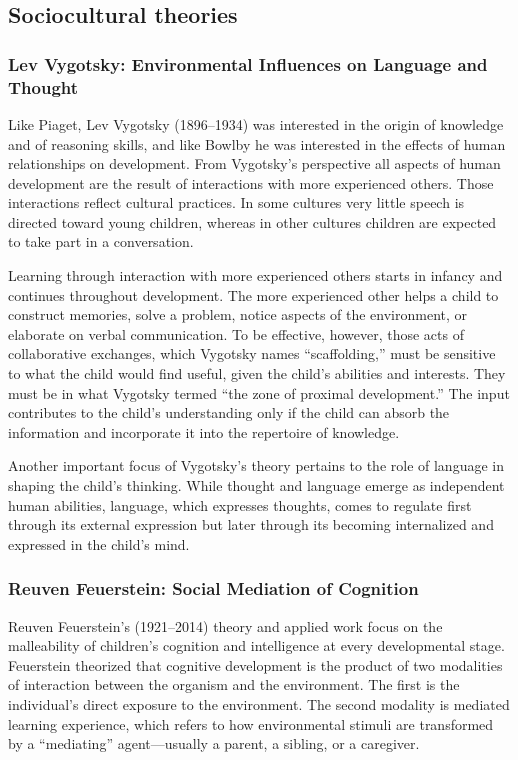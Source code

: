 \subsection{Sociocultural theories}
\subsubsection{Lev Vygotsky: Environmental Influences on Language and Thought}
Like Piaget, Lev Vygotsky (1896–1934) was interested in the origin of knowledge
and of reasoning skills, and like Bowlby he was interested in the effects of
human relationships on development. From Vygotsky’s perspective all aspects of
human development are the result of interactions with more experienced others.
Those interactions reflect cultural practices. In some cultures very little
speech is directed toward young children, whereas in other cultures children
are expected to take part in a conversation. \cite{Feldman3}

Learning through interaction with more experienced others starts in infancy and
continues throughout development. The more experienced other helps a child to
construct memories, solve a problem, notice aspects of the environment, or
elaborate on verbal communication. To be effective, however, those acts of
collaborative exchanges, which Vygotsky names “scaffolding,” must be sensitive
to what the child would find useful, given the child’s abilities and interests.
They must be in what Vygotsky termed “the zone of proximal development.” The
input contributes to the child’s understanding only if the child can absorb the
information and incorporate it into the repertoire of knowledge.
\cite{Feldman3}

Another important focus of Vygotsky’s theory pertains to the role of language
in shaping the child’s thinking. While thought and language emerge as
independent human abilities, language, which expresses thoughts, comes to
regulate first through its external expression but later through its becoming
internalized and expressed in the child’s mind. \cite{Feldman3}

\subsubsection{Reuven Feuerstein: Social Mediation of Cognition}
Reuven Feuerstein’s (1921–2014) theory and applied work focus on the
malleability of children’s cognition and intelligence at every developmental
stage. Feuerstein theorized that cognitive development is the product of two
modalities of interaction between the organism and the environment. The first
is the individual’s direct exposure to the environment. The second modality is
mediated learning experience, which refers to how environmental stimuli are
transformed by a “mediating” agent—usually a parent, a sibling, or a caregiver.
\cite{Feldman3}

